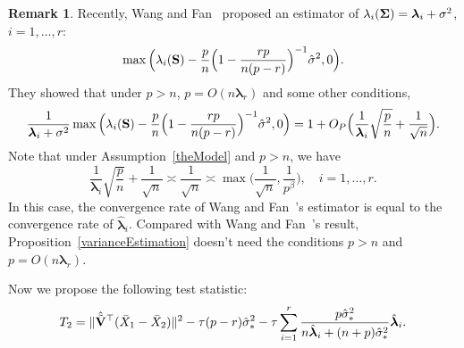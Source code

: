 \documentclass[times,sort&compress,3p]{elsarticle}
\newcommand{\bfsym}[1]{\ensuremath{\boldsymbol{#1}}}
\def\blambda {\bfsym {\lambda}}        \def\bLambda {\bfsym {\Lambda}}
\theoremstyle{plain}
\theoremstyle{definition}
\newtheorem{remark}{\quad\quad Remark}
\theoremstyle{remark}
\begin{document}
\begin{remark}
    Recently, Wang and Fan~\cite{Fan2015Asymptotics} proposed an estimator of
    $\lambda_i(\bSigma)=\blambda_i+\sigma^2$, $i=1,\ldots, r$:
    $$
    \max\Big(\lambda_i(\mathbf{S})-\frac{p}{n}\Big(1-\frac{rp}{n(p-r)}\Big)^{-1}\hat{\sigma}^2,0\Big).
    $$
    They showed that under $p>n$, $p=O(n\blambda_r)$ and some other conditions,
    $$
    \frac{1}{\blambda_i+\sigma^2}\max\Big(\lambda_i(\BS)-\frac{p}{n}\Big(1-\frac{rp}{n(p-r)}\Big)^{-1}\hat{\sigma}^2,0\Big)
    =1+O_P\Big(\frac{1}{\blambda_i}\sqrt{\frac{p}{n}}+\frac{1}{\sqrt{n}}\Big).
    $$
    Note that under Assumption~\ref{theModel} and $p>n$, we have
    $$
\frac{1}{\blambda_i}\sqrt{\frac{p}{n}}+\frac{1}{\sqrt{n}}\asymp
\frac{1}{\sqrt{n}}
\asymp
        \max\big(\frac{1}{\sqrt{n}},\frac{1}{p^{\beta}}\big),\quad i=1,\ldots,r.
    $$
    In this case, the convergence rate of Wang and Fan~\cite{Fan2015Asymptotics}'s estimator is equal to the convergence rate of $\hat{\blambda}_i$.
    Compared with Wang and Fan~\cite{Fan2015Asymptotics}'s result, Proposition~\ref{varianceEstimation} doesn't need the conditions $p>n$ and $p=O(n\blambda_r)$.
\end{remark}


Now we propose the following test statistic:
$$
T_2=
\|\hat{\tilde{\BV}}^\top  (\bar{X}_1-\bar{X}_2)\|^2
-
\tau(p-r)\hat{\sigma}_*^2 
- \tau\sum_{i=1}^r \frac{p\hat{\sigma}_*^2}{n\hat{\blambda}_i+(n+p)\hat{\sigma}_*^2}\hat{\blambda}_i.
$$
\end{document}
